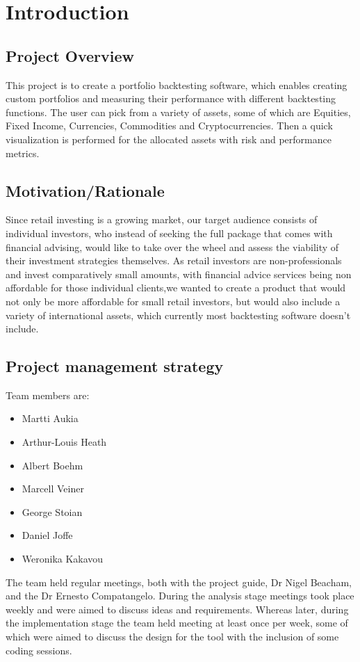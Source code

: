 \documentclass[main.tex]{subfiles}
\begin{document}
\section{Introduction}
\subsection {Project Overview}

This project is to create a portfolio backtesting software, which enables creating custom portfolios and measuring their performance with different backtesting functions. The user can pick from a variety of assets, some of which are Equities, Fixed Income, Currencies, Commodities and Cryptocurrencies. Then a quick visualization is performed for the allocated assets with risk and performance metrics.
\subsection{Motivation/Rationale}
Since retail investing is a growing market, our target audience consists of individual investors, who instead of seeking the full package that comes with financial advising, would like to take over the wheel and assess the viability of their investment strategies themselves. As retail investors are non-professionals and invest comparatively small amounts, with financial advice services being non affordable for those individual clients,we wanted to create a product that would not only be more affordable for small retail investors, but would also include a variety of international assets, which currently most backtesting software doesn't include.

\subsection{Project management strategy}

Team members are:
\begin{itemize}
    \item Martti Aukia
    \item Arthur-Louis Heath
	\item Albert Boehm
	\item Marcell Veiner
	\item George Stoian
	\item Daniel Joffe
	\item Weronika Kakavou

\end{itemize}

The team held regular meetings, both with the project guide, Dr Nigel Beacham, and the Dr Ernesto Compatangelo. During the analysis stage meetings took place weekly and were aimed to discuss ideas and requirements. Whereas later, during the implementation stage the team held meeting at least once per week, some of which were aimed to discuss the design for the tool with the inclusion of some coding sessions.
\end{document}
